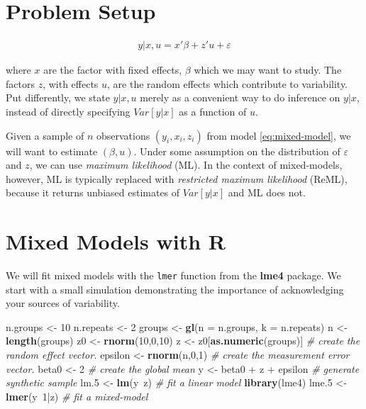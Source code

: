 \documentclass[]{book}
\newenvironment{Shaded}{\begin{snugshade}}{\end{snugshade}}
\newcommand{\KeywordTok}[1]{\textcolor[rgb]{0.13,0.29,0.53}{\textbf{{#1}}}}
\newcommand{\DataTypeTok}[1]{\textcolor[rgb]{0.13,0.29,0.53}{{#1}}}
\newcommand{\DecValTok}[1]{\textcolor[rgb]{0.00,0.00,0.81}{{#1}}}
\newcommand{\FloatTok}[1]{\textcolor[rgb]{0.00,0.00,0.81}{{#1}}}
\newcommand{\StringTok}[1]{\textcolor[rgb]{0.31,0.60,0.02}{{#1}}}
\newcommand{\CommentTok}[1]{\textcolor[rgb]{0.56,0.35,0.01}{\textit{{#1}}}}
\newcommand{\NormalTok}[1]{{#1}}
\theoremstyle{definition}
\theoremstyle{definition}
\theoremstyle{remark}
\begin{document}
\section{Problem Setup}\label{problem-setup-2}

\begin{align}
  y|x,u = x'\beta + z'u + \varepsilon
  \label{eq:mixed-model}  
\end{align}

where \(x\) are the factor with fixed effects, \(\beta\) which we may
want to study. The factors \(z\), with effects \(u\), are the random
effects which contribute to variability. Put differently, we state
\(y|x,u\) merely as a convenient way to do inference on \(y|x\), instead
of directly specifying \(Var[y|x]\) as a function of \(u\).

Given a sample of \(n\) observations \((y_i,x_i,z_i)\) from model
\eqref{eq:mixed-model}, we will want to estimate \((\beta,u)\). Under some
assumption on the distribution of \(\varepsilon\) and \(z\), we can use
\emph{maximum likelihood} (ML). In the context of mixed-models, however,
ML is typically replaced with \emph{restricted maximum likelihood}
(ReML), because it returns unbiased estimates of \(Var[y|x]\) and ML
does not.

\section{Mixed Models with R}\label{mixed-models-with-r}

We will fit mixed models with the \texttt{lmer} function from the
\textbf{lme4} package. We start with a small simulation demonstrating
the importance of acknowledging your sources of variability.

\begin{Shaded}
\begin{Highlighting}[]
\NormalTok{n.groups <-}\StringTok{ }\DecValTok{10}
\NormalTok{n.repeats <-}\StringTok{ }\DecValTok{2}
\NormalTok{groups <-}\StringTok{ }\KeywordTok{gl}\NormalTok{(}\DataTypeTok{n =} \NormalTok{n.groups, }\DataTypeTok{k =} \NormalTok{n.repeats)}
\NormalTok{n <-}\StringTok{ }\KeywordTok{length}\NormalTok{(groups)}
\NormalTok{z0 <-}\StringTok{ }\KeywordTok{rnorm}\NormalTok{(}\DecValTok{10}\NormalTok{,}\DecValTok{0}\NormalTok{,}\DecValTok{10}\NormalTok{)}
\NormalTok{z <-}\StringTok{ }\NormalTok{z0[}\KeywordTok{as.numeric}\NormalTok{(groups)] }\CommentTok{# create the random effect vector.}
\NormalTok{epsilon <-}\StringTok{ }\KeywordTok{rnorm}\NormalTok{(n,}\DecValTok{0}\NormalTok{,}\DecValTok{1}\NormalTok{) }\CommentTok{# create the measurement error vector.}
\NormalTok{beta0 <-}\StringTok{ }\DecValTok{2} \CommentTok{# create the global mean}
\NormalTok{y <-}\StringTok{ }\NormalTok{beta0 +}\StringTok{ }\NormalTok{z  +}\StringTok{ }\NormalTok{epsilon }\CommentTok{# generate synthetic sample}
\NormalTok{lm}\FloatTok{.5} \NormalTok{<-}\StringTok{ }\KeywordTok{lm}\NormalTok{(y~z)  }\CommentTok{# fit a linear model}
\KeywordTok{library}\NormalTok{(lme4)}
\NormalTok{lme}\FloatTok{.5} \NormalTok{<-}\StringTok{ }\KeywordTok{lmer}\NormalTok{(y~}\DecValTok{1}\NormalTok{|z) }\CommentTok{# fit a mixed-model}
\end{Highlighting}
\end{Shaded}
\end{document}
